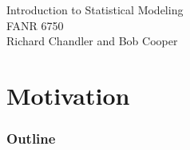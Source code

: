\documentclass[color=usenames,dvipsnames]{beamer}\usepackage[]{graphicx}\usepackage[]{color}
\begin{document}



\begin{frame}[plain]
  \huge
  \centering \par
  \textcolor{NavyBlue}{Introduction to Statistical Modeling} \\
  \vspace{1cm}
  \Large
  FANR 6750 \\
  \vfill
  \large
  Richard Chandler and Bob Cooper
\end{frame}


\section{Motivation}



\begin{frame}
  \frametitle{Outline}
  \LARGE
\end{frame}
\end{document}
